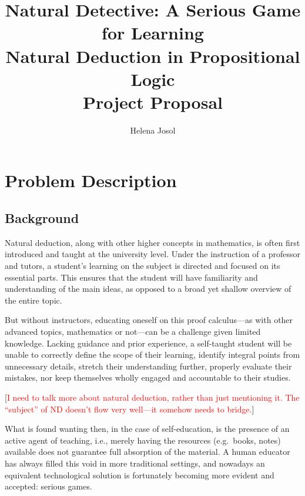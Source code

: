 \documentclass[a4paper]{article}
\title{Natural Detective: A Serious Game for Learning \\ Natural Deduction in Propositional Logic \\
  \medskip \Large{Project Proposal}}
\author{Helena Josol}
\date{}
\newcommand{\comment}[1]{[\textcolor{red}{#1}]} %
\begin{document}
\maketitle

%
%

\section{Problem Description}

\subsection{Background}
Natural deduction, along with other higher concepts in mathematics, is often first introduced and taught at the university level. Under the instruction of a professor and tutors, a student's learning on the subject is directed and focused on its essential parts. This ensures that the student will have familiarity and understanding of the main ideas, as opposed to a broad yet shallow overview of the entire topic.

But without instructors, educating oneself on this proof calculus---as with other advanced topics, mathematics or not---can be a challenge given limited knowledge. Lacking guidance and prior experience, a self-taught student will be unable to correctly define the scope of their learning, identify integral points from unnecessary details, stretch their understanding further, properly evaluate their mistakes, nor keep themselves wholly engaged and accountable to their studies.

\comment{I need to talk more about natural deduction, rather than just mentioning it. The ``subject'' of ND doesn't flow very well---it somehow needs to bridge.}

What is found wanting then, in the case of self-education, is the presence of an active agent of teaching, i.e., merely having the resources (e.g.\ books, notes) available does not guarantee full absorption of the material. A human educator has always filled this void in more traditional settings, and nowadays an equivalent technological solution is fortunately becoming more evident and accepted: serious games.
\end{document}
